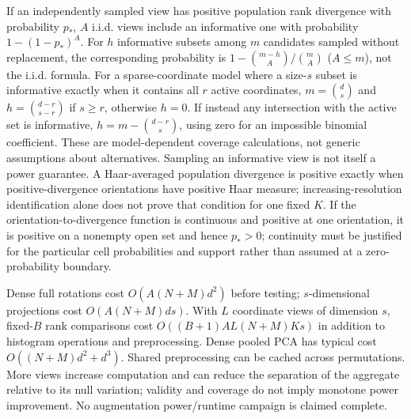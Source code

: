 {If an independently sampled view has positive population rank divergence with probability $p_*$, $A$ i.i.d. views include an informative one with probability $1-(1-p_*)^A$. For $h$ informative subsets among $m$ candidates sampled without replacement, the corresponding probability is $1-\binom{m-h}{A}/\binom mA$ ($A\le m$), not the i.i.d. formula. For a sparse-coordinate model where a size-$s$ subset is informative exactly when it contains all $r$ active coordinates, $m=\binom ds$ and $h=\binom{d-r}{s-r}$ if $s\ge r$, otherwise $h=0$. If instead any intersection with the active set is informative, $h=m-\binom{d-r}{s}$, using zero for an impossible binomial coefficient. These are model-dependent coverage calculations, not generic assumptions about alternatives. Sampling an informative view is not itself a power guarantee. A Haar-averaged population divergence is positive exactly when positive-divergence orientations have positive Haar measure; increasing-resolution identification alone does not prove that condition for one fixed $K$. If the orientation-to-divergence function is continuous and positive at one orientation, it is positive on a nonempty open set and hence $p_*>0$; continuity must be justified for the particular cell probabilities and support rather than assumed at a zero-probability boundary.

Dense full rotations cost $O(A(N+M)d^2)$ before testing; $s$-dimensional projections cost $O(A(N+M)ds)$. With $L$ coordinate views of dimension $s$, fixed-$B$ rank comparisons cost $O((B+1)AL(N+M)Ks)$ in addition to histogram operations and preprocessing. Dense pooled PCA has typical cost $O((N+M)d^2+d^3)$. Shared preprocessing can be cached across permutations. More views increase computation and can reduce the separation of the aggregate relative to its null variation; validity and coverage do not imply monotone power improvement. No augmentation power/runtime campaign is claimed complete.

}
